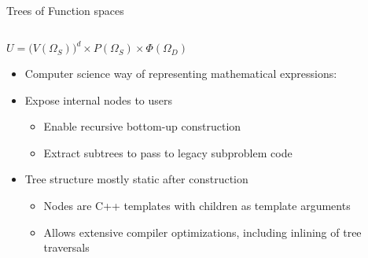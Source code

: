 \documentclass[aspectratio=169,11pt]{beamer}
\theoremstyle{definition}
\begin{document}
\begin{frame}{Trees of Function spaces}
  \begin{columns}
    \begin{column}{0.6\textwidth}
$U = \bigl(V(\Omega_S)\bigr)^d \times P(\Omega_S) \times \Phi(\Omega_D)$

\begin{itemize}
\item Computer science way of representing mathematical  expressions: 
\item Expose internal nodes to users
  \begin{itemize}
  \item {\small Enable recursive bottom-up construction}
  \item {\small Extract subtrees to pass to legacy subproblem code}
  \end{itemize}
\item Tree structure mostly static after construction
  \begin{itemize}
  \item {\small Nodes are C++ templates with children as template arguments}
  \item {\small Allows extensive compiler optimizations, including inlining of tree traversals}
  \end{itemize}
\end{itemize}

    \end{column}
    \begin{column}{0.4\textwidth}

    \end{column}
  \end{columns}


\end{frame}
\end{document}
